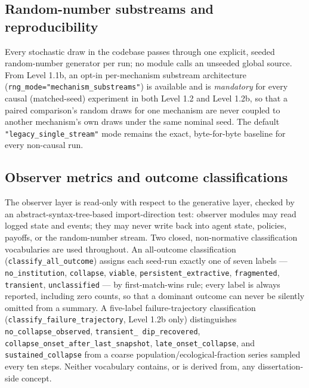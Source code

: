\subsection{Random-number substreams and reproducibility}
\label{sec:rng-substreams}

Every stochastic draw in the codebase passes through one explicit, seeded
random-number generator per run; no module calls an unseeded global
source. From Level 1.1b, an opt-in per-mechanism substream architecture
(\texttt{rng\_mode="mechanism\_substreams"}) is available and is
\textit{mandatory} for every causal (matched-seed) experiment in both
Level 1.2 and Level 1.2b, so that a paired comparison's random draws for
one mechanism are never coupled to another mechanism's own draws under
the same nominal seed. The default \texttt{"legacy\_single\_stream"} mode
remains the exact, byte-for-byte baseline for every non-causal run.

\subsection{Observer metrics and outcome classifications}
\label{sec:observer-metrics}

The observer layer is read-only with respect to the generative layer,
checked by an abstract-syntax-tree-based import-direction test: observer
modules may read logged state and events; they may never write back into
agent state, policies, payoffs, or the random-number stream. Two closed,
non-normative classification vocabularies are used throughout. An
all-outcome classification (\texttt{classify\_all\_outcome}) assigns each
seed-run exactly one of seven labels ---
\texttt{no\_institution}, \texttt{collapse}, \texttt{viable},
\texttt{persistent\_extractive}, \texttt{fragmented}, \texttt{transient},
\texttt{unclassified} --- by first-match-wins rule; every label is always
reported, including zero counts, so that a dominant outcome can never be
silently omitted from a summary. A five-label failure-trajectory
classification (\texttt{classify\_failure\_trajectory}, Level 1.2b only)
distinguishes \texttt{no\_collapse\_observed}, \texttt{transient\_%
dip\_recovered}, \texttt{collapse\_onset\_after\_last\_snapshot},
\texttt{late\_onset\_collapse}, and \texttt{sustained\_collapse} from a
coarse population/ecological-fraction series sampled every ten steps.
Neither vocabulary contains, or is derived from, any dissertation-side
concept.


